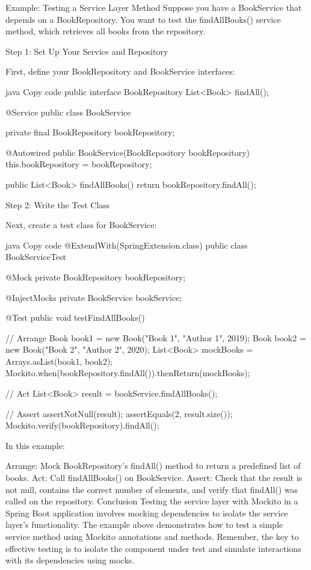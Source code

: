  
 Example: Testing a Service Layer Method
Suppose you have a BookService that depends on a BookRepository. You want to test the findAllBooks() service method, which retrieves all books from the repository.

Step 1: Set Up Your Service and Repository

First, define your BookRepository and BookService interfaces:

java
Copy code
public interface BookRepository {
    List<Book> findAll();
}

@Service
public class BookService {
    private final BookRepository bookRepository;

    @Autowired
    public BookService(BookRepository bookRepository) {
        this.bookRepository = bookRepository;
    }

    public List<Book> findAllBooks() {
        return bookRepository.findAll();
    }
}
Step 2: Write the Test Class

Next, create a test class for BookService:

java
Copy code
@ExtendWith(SpringExtension.class)
public class BookServiceTest {

    @Mock
    private BookRepository bookRepository;

    @InjectMocks
    private BookService bookService;

    @Test
    public void testFindAllBooks() {
        // Arrange
        Book book1 = new Book("Book 1", "Author 1", 2019);
        Book book2 = new Book("Book 2", "Author 2", 2020);
        List<Book> mockBooks = Arrays.asList(book1, book2);
        Mockito.when(bookRepository.findAll()).thenReturn(mockBooks);

        // Act
        List<Book> result = bookService.findAllBooks();

        // Assert
        assertNotNull(result);
        assertEquals(2, result.size());
        Mockito.verify(bookRepository).findAll();
    }
}
In this example:

Arrange: Mock BookRepository's findAll() method to return a predefined list of books.
Act: Call findAllBooks() on BookService.
Assert: Check that the result is not null, contains the correct number of elements, and verify that findAll() was called on the repository.
Conclusion
Testing the service layer with Mockito in a Spring Boot application involves mocking dependencies to isolate the service layer's functionality. The example above demonstrates how to test a simple service method using Mockito annotations and methods. Remember, the key to effective testing is to isolate the component under test and simulate interactions with its dependencies using mocks.
 
 
 
